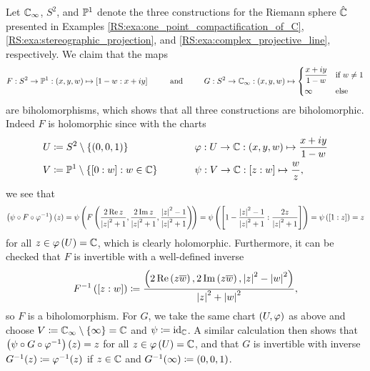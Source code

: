\documentclass[../Moduli_Spaces_of_Riemann_Surfaces.tex]{subfiles}
\begin{document}
    \begin{example}\label{RS:exa:biholomorphisms_between_Riemann_spheres}
        Let $\C_\infty$, $S^2$, and $\P^1$ denote the three constructions for the Riemann sphere $\RS$ presented in Examples \ref{RS:exa:one_point_compactification_of_C}, \ref{RS:exa:stereographic_projection}, and \ref{RS:exa:complex_projective_line}, respectively. We claim that the maps
        \begin{equation*}
            F:S^2\to\P^1:\tpl{x,y,w}\mapsto\proje{1-w:x+iy}\ \ \ \ \ \ \ \ \textrm{and}\ \ \ \ \ \ \ \ G:S^2\to\C_\infty:\tpl{x,y,w}\mapsto
            \begin{dcases}
                \frac{x+iy}{1-w} & \textrm{if }w\neq1 \\
                \infty & \textrm{else}
            \end{dcases}
        \end{equation*}
        are biholomorphisms, which shows that all three constructions are biholomorphic. Indeed $F$ is holomorphic since with the charts
        \begin{equation*}
            \begin{alignedat}{2}
                U&\coloneqq S^2\comp\l\{\l(0,0,1\r)\r\}\ \ \ \ \ \ \ \ \ \ \ \ \ \ \ \ \ \ \ \ &&\phi:U\to\C:\tpl{x,y,w}\mapsto\frac{x+iy}{1-w} \\
                V&\coloneqq\P^1\comp\l\{\proje{0:w}\st w\in\C\r\}&&\psi:V\to\C:\proje{z:w}\mapsto\frac{w}{z},
            \end{alignedat}
        \end{equation*}
        we see that
        \begin{equation*}
            \l(\psi\circ F\circ\phi^{-1}\r)\l(z\r)=\psi\l(F\l(\frac{2\Re z}{\l|z\r|^2+1},\frac{2\Im z}{\l|z\r|^2+1},\frac{\l|z\r|^2-1}{\l|z\r|^2+1}\r)\!\r)=\psi\l(\proje{1-\frac{\l|z\r|^2-1}{\l|z\r|^2+1}:\frac{2z}{\l|z\r|^2+1}}\r)=\psi\l(\proje{1:z}\r)=z
        \end{equation*}
        for all $z\in\phi\l(U\r)=\C$, which is clearly holomorphic. Furthermore, it can be checked that $F$ is invertible with a well-defined inverse
        \begin{equation*}
            F^{-1}\l(\proje{z:w}\r)\coloneqq\frac{\tpl{2\Re\l(z\bar{w}\r),2\Im\l(z\bar{w}\r),\l|z\r|^2-\l|w\r|^2}}{\l|z\r|^2+\l|w\r|^2},
        \end{equation*}
        so $F$ is a biholomorphism. For $G$, we take the same chart $\tpl{U,\phi}$ as above and choose $V\coloneqq\C_\infty\comp\l\{\infty\r\}=\C$ and $\psi\coloneqq\id_\C$. A similar calculation then shows that $\l(\psi\circ G\circ\phi^{-1}\r)\l(z\r)=z$ for all $z\in\phi\l(U\r)=\C$, and that $G$ is invertible with inverse $G^{-1}\!\l(z\r)\coloneqq\phi^{-1}\!\l(z\r)$ if $z\in\C$ and $G^{-1}\!\l(\infty\r)\coloneqq\tpl{0,0,1}$.\exqed
    \end{example}
\end{document}
